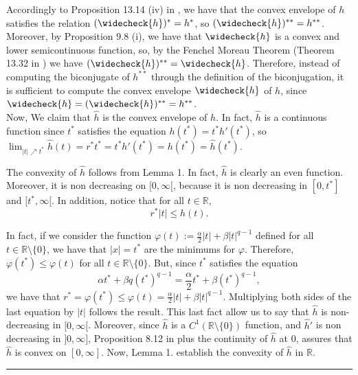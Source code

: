 \documentclass[11pt,a4paper]{amsart}
\newcommand{\kw}{\rule{2mm}{2mm}}
\newcommand{\reals}{\mathbb{R}}
\renewenvironment{proof}{{Proof.}}{\hfill\kw}
\begin{document}
\begin{proof}
    Accordingly to Proposition 13.14 (iv) in \cite{combettes}, we have that the convex envelope of $h$ satisfies the relation $(\widecheck{h})^*=h^*$, so $(\widecheck{h})^{**}=h^{**}$. Moreover, by Proposition 9.8 (i), we have that $\widecheck{h}$ is a convex and lower semicontinuous function, so, by the Fenchel Moreau Theorem (Theorem 13.32 in \cite{combettes}) we have $(\widecheck{h})^{**}=\widecheck{h}$. Therefore, instead of computing the biconjugate of $h^{**}$ through the definition of the biconjugation, it is sufficient to compute the convex envelope $\widecheck{h}$ of $h$, since $\widecheck{h}=(\widecheck{h})^{**}=h^{**}$.\\ 

    Now, We claim that $\widehat{h}$ is the convex envelope of $h$. In fact, $\widehat{h}$ is a continuous function since $t^*$ satisfies the equation $h(t^*)=t^*h'(t^*)$, so $\lim_{|t|\nearrow t^*}\widehat{h}(t)=r^*t^*=t^*h'(t^*)=h(t^*)=\widehat{h}(t^*)$. 

    The convexity of $\widehat{h}$ follows from Lemma 1. In fact, $\widehat{h}$ is clearly an even function. Moreover, it is non decreasing on $[0,\infty[$, because it is non decreasing in $[0,t^*]$ and $[t^*,\infty[$. In addition, notice that for all $t\in \reals$, 
    \begin{equation}\label{lemma1:ineq1}
         r^*|t|\le h(t). 
    \end{equation}
    
    In fact, if we consider the function $\varphi(t):=\frac{\alpha}{2}|t|+\beta|t|^{q-1}$ defined for all $t\in \mathbb{R}\setminus\{0\}$, we have that $|x|=t^*$ are the minimums for $\varphi$. Therefore, $\varphi(t^*)\le \varphi(t)$ for all $t\in \mathbb{R}\setminus\{0\}$. But, since $t^*$ satisfies the equation
    \[
    \alpha t^*+\beta q (t^*)^{q-1}=\frac{\alpha}{2}t^*+\beta(t^*)^{q-1},
    \]
    we have that $r^*=\varphi(t^*)\le \varphi(t)=\frac{\alpha}{2}|t|+\beta|t|^{q-1}$. Multiplying both sides of the last equation by $|t|$ follows the result. This last fact allow us to say that $\widehat{h}$ is non-decreasing in $[0,\infty[$. Moreover, since $\widehat{h}$ is a $C^1(\reals\setminus\{0\})$ function, and $\widehat{h}'$ is non decreasing in $]0,\infty]$, Proposition 8.12 in \cite{combettes} plus the continuity of $\widehat{h}$ at $0$, assures that $\widehat{h}$ is convex on $[0,\infty]$. Now, Lemma 1. establish the convexity of $\widehat{h}$ in $\reals$.\\   


\end{proof}
\end{document}
